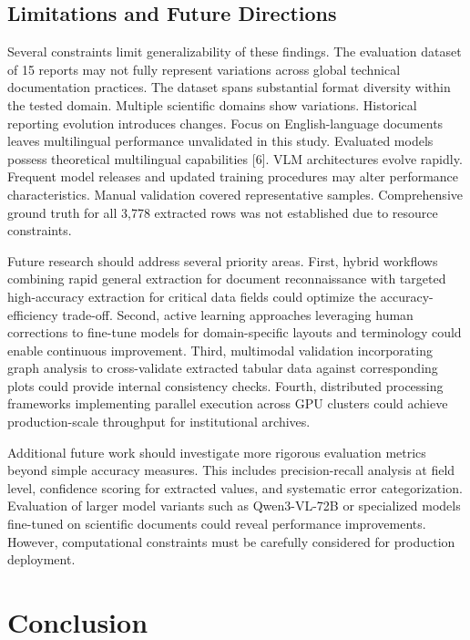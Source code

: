 \documentclass{svproc}
\begin{document}
\subsection{Limitations and Future Directions}

Several constraints limit generalizability of these findings. The evaluation dataset of 15 reports may not fully represent variations across global technical documentation practices. The dataset spans substantial format diversity within the tested domain. Multiple scientific domains show variations. Historical reporting evolution introduces changes. Focus on English-language documents leaves multilingual performance unvalidated in this study. Evaluated models possess theoretical multilingual capabilities [6]. VLM architectures evolve rapidly. Frequent model releases and updated training procedures may alter performance characteristics. Manual validation covered representative samples. Comprehensive ground truth for all 3,778 extracted rows was not established due to resource constraints.

Future research should address several priority areas. First, hybrid workflows combining rapid general extraction for document reconnaissance with targeted high-accuracy extraction for critical data fields could optimize the accuracy-efficiency trade-off. Second, active learning approaches leveraging human corrections to fine-tune models for domain-specific layouts and terminology could enable continuous improvement. Third, multimodal validation incorporating graph analysis to cross-validate extracted tabular data against corresponding plots could provide internal consistency checks. Fourth, distributed processing frameworks implementing parallel execution across GPU clusters could achieve production-scale throughput for institutional archives.

Additional future work should investigate more rigorous evaluation metrics beyond simple accuracy measures. This includes precision-recall analysis at field level, confidence scoring for extracted values, and systematic error categorization. Evaluation of larger model variants such as Qwen3-VL-72B or specialized models fine-tuned on scientific documents could reveal performance improvements. However, computational constraints must be carefully considered for production deployment.

\section{Conclusion}
\end{document}
